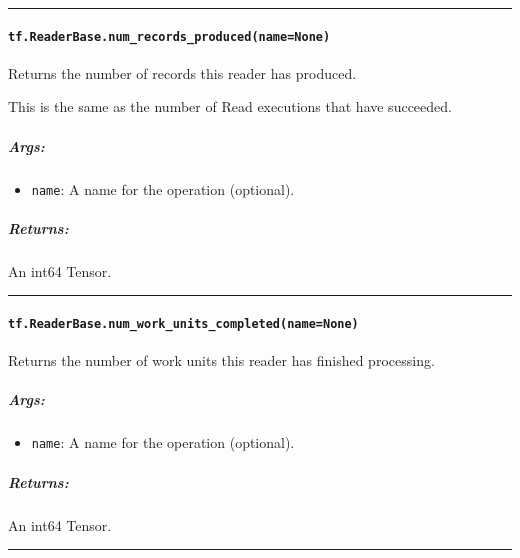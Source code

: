 \begin{center}\rule{0.5\linewidth}{\linethickness}\end{center}

\paragraph{\texorpdfstring{\texttt{tf.ReaderBase.num\_records\_produced(name=None)}
}{tf.ReaderBase.num\_records\_produced(name=None) }}\label{tf.readerbase.numux5frecordsux5fproducednamenone}

Returns the number of records this reader has produced.

This is the same as the number of Read executions that have succeeded.

\subparagraph{Args: }\label{args-2}

\begin{itemize}
\tightlist
\item
  \texttt{name}: A name for the operation (optional).
\end{itemize}

\subparagraph{Returns: }\label{returns-1}

An int64 Tensor.

\begin{center}\rule{0.5\linewidth}{\linethickness}\end{center}

\paragraph{\texorpdfstring{\texttt{tf.ReaderBase.num\_work\_units\_completed(name=None)}
}{tf.ReaderBase.num\_work\_units\_completed(name=None) }}\label{tf.readerbase.numux5fworkux5funitsux5fcompletednamenone}

Returns the number of work units this reader has finished processing.

\subparagraph{Args: }\label{args-3}

\begin{itemize}
\tightlist
\item
  \texttt{name}: A name for the operation (optional).
\end{itemize}

\subparagraph{Returns: }\label{returns-2}

An int64 Tensor.

\begin{center}\rule{0.5\linewidth}{\linethickness}\end{center}

